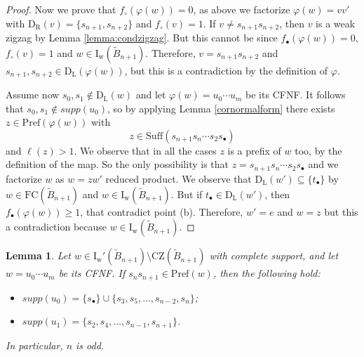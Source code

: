 \documentclass{amsart}
\newcommand{\B}{{\widetilde{B}_{n+1}}}
\newcommand{\ld}{{\mathrm{D}_{\mathrm{L}}}}
\newcommand{\rd}{{\mathrm{D}_{\mathrm{R}}}}
\newcommand{\fc}{{\mathrm{FC}}}
\newcommand{\s}{{s_{\bullet}}}
\newcommand{\ti}{{t_{\bullet}}}
\newcommand{\su}{\mathrm{Suff}}
\newcommand{\pr}{\mathrm{Pref}}
\newcommand{\zz}{\mathrm{CZ}}
\newcommand{\IR}{\mathrm{I_w}}
\newcommand{\IRc}{\mathrm{I_w'}}
\newcommand{\nmap}{\varphi}
\newtheorem{Lemma}[Theorem]{Lemma}
\theoremstyle{definition}
\begin{document}
\begin{proof}
    Now we prove that $f_\circ(\nmap(w))=0$, as above we factorize $\nmap(w)=v v'$ with $\rd(v)=\{s_{n+1},s_{n+2}\}$ and $f_\circ(v)=1$. If $v\ne s_{n+1}s_{n+2}$, then $v$ is a weak zigzag by Lemma \ref{lemma:condzigzag}. But this cannot be since $f_\bullet(\nmap(w))=0$, $f_\circ(v)=1$ and $w\in \IR(\B)$. 
    Therefore, $v=s_{n+1}s_{n+2}$ and $s_{n+1},s_{n+2}\in \ld(\nmap(w))$, but this is a contradiction by the definition of $\nmap$. 
    
    
    Assume now $s_0,s_1\notin \ld(w)$ and let $\nmap(w)=u_0\cdots u_m$ be its CFNF. It follows that $s_0,s_1\notin supp(u_0)$, so by applying Lemma \ref{cornormalform} there exists $z\in \pr(\nmap(w))$ with \[z\in \su(s_{n+1
    } s_n\cdots s_2\s ) \] and $\ell(z)> 1$. We observe that in all the cases $z$ is a prefix of $w$ too, by the definition of the map. So the only possibility is that $z=s_{n+1} s_n\cdots s_2\s$ and we factorize $w$ as $w=zw'$ reduced product. We observe that $\ld(w')\subseteq \{\ti\}$ by $w\in \fc(\B)$ and $w\in \IR(\B)$. But if $\ti\in \ld(w')$, then $f_\bullet(\nmap(w))\ge1$, that contradict point (b). Therefore, $w'=e$ and $w=z$ but this a contradiction because $w\in \IR(\B)$. 
   
\end{proof}



\begin{Lemma}
\label{lemma:lemmaBdue}
    Let $w\in \IRc(\B) \setminus \zz(\B)$ with complete support, and let $w=u_0\cdots u_m$ be its CFNF. If $s_ns_{n+1}\in \pr(w)$, then the following hold:
    \begin{itemize}
        \item[(a)] $supp(u_0)=\{\s\} \cup \{s_3, s_5, \ldots, s_{n-2},s_n\}$;
        \item[(b)] $supp(u_1)=\{s_2, s_4, \ldots, s_{n-1},s_{n+1}\}$.
    \end{itemize}
    In particular, $n$ is odd. 
\end{Lemma}
\end{document}
